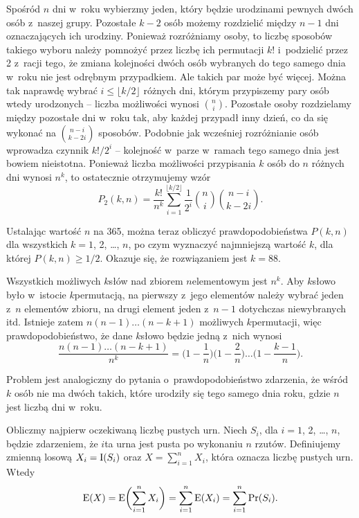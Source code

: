 Spośród $n$ dni w~roku wybierzmy jeden, który będzie urodzinami pewnych dwóch osób z~naszej grupy.
Pozostałe $k-2$ osób możemy rozdzielić między $n-1$ dni oznaczających ich urodziny.
Ponieważ rozróżniamy osoby, to liczbę sposobów takiego wyboru należy pomnożyć przez liczbę ich permutacji $k!$ i~podzielić przez 2 z~racji tego, że zmiana kolejności dwóch osób wybranych do tego samego dnia w~roku nie jest odrębnym przypadkiem.
Ale takich par może być więcej.
Można tak naprawdę wybrać $i\le\lfloor k/2\rfloor$ różnych dni, którym przypiszemy pary osób wtedy urodzonych -- liczba możliwości wynosi $\binom{n}{i}$.
Pozostałe osoby rozdzielamy między pozostałe dni w~roku tak, aby każdej przypadł inny dzień, co da się wykonać na $\binom{n-i}{k-2i}$ sposobów.
Podobnie jak wcześniej rozróżnianie osób wprowadza czynnik $k!/2^i$ -- kolejność w~parze w~ramach tego samego dnia jest bowiem nieistotna.
Ponieważ liczba możliwości przypisania $k$ osób do $n$ różnych dni wynosi $n^k$, to ostatecznie otrzymujemy wzór
\[
	P_2(k,n) = \frac{k!}{n^k}\sum_{i=1}^{\lfloor k/2\rfloor}\frac{1}{2^i}\binom{n}{i}\binom{n-i}{k-2i}.
\]

Ustalając wartość $n$ na 365, można teraz obliczyć prawdopodobieństwa $P(k,n)$ dla wszystkich $k=1$, 2, \dots, $n$, po czym wyznaczyć najmniejszą wartość $k$, dla której $P(k,n)\ge1/2$.
Okazuje się, że rozwiązaniem jest $k=88$.

\exercise %
Wszystkich możliwych $k$\nbhyphen słów nad zbiorem $n$\nbhyphen elementowym jest $n^k$.
Aby $k$\nbhyphen słowo było w~istocie $k$\nbhyphen permutacją, na pierwszy z~jego elementów należy wybrać jeden z~$n$ elementów zbioru, na drugi element jeden z~$n-1$ dotychczas niewybranych itd.
Istnieje zatem $n(n-1)\dots(n-k+1)$ możliwych $k$\nbhyphen permutacji, więc prawdopodobieństwo, że dane $k$\nbhyphen słowo będzie jedną z~nich wynosi
\[
	\frac{n(n-1)\dots(n-k+1)}{n^k} = \biggl(1-\frac{1}{n}\biggr)\biggl(1-\frac{2}{n}\biggr)\dots\biggl(1-\frac{k-1}{n}\biggr).
\]

Problem jest analogiczny do pytania o~prawdopodobieństwo zdarzenia, że wśród $k$ osób nie ma dwóch takich, które urodziły się tego samego dnia roku, gdzie $n$ jest liczbą dni w~roku.

\exercise %
Obliczmy najpierw oczekiwaną liczbę pustych urn.
Niech $S_i$, dla $i=1$, 2, \dots, $n$, będzie zdarzeniem, że $i$\nbhyphen ta urna jest pusta po wykonaniu $n$ rzutów.
Definiujemy zmienną losową $X_i=\operatorname{I}(S_i)$ oraz $X=\sum_{i=1}^nX_i$, która oznacza liczbę pustych urn.
Wtedy
\[
	\operatorname{E}(X) = \operatorname{E}\biggl(\sum_{i=1}^nX_i\biggr) = \sum_{i=1}^n\operatorname{E}(X_i) = \sum_{i=1}^n\Pr(S_i).
\]

